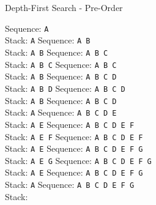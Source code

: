 \begin{frame}{Depth-First Search - Pre-Order}
{\bigskip
\begin{overprint}
Sequence: \alert{\texttt{A}}\\
Stack: \alert{\texttt{A}}
Sequence: \alert{\texttt{A  B}}\\
Stack: \alert{\texttt{A  B}}
Sequence: \alert{\texttt{A  B  C}}\\
Stack: \alert{\texttt{A  B  C}}
Sequence: \alert{\texttt{A  B  C}}\\
Stack: \alert{\texttt{A  B}}
Sequence: \alert{\texttt{A  B  C  D}}\\
Stack: \alert{\texttt{A  B  D}}
Sequence: \alert{\texttt{A  B  C  D}}\\
Stack: \alert{\texttt{A  B}}
Sequence: \alert{\texttt{A  B  C  D}}\\
Stack: \alert{\texttt{A}}
Sequence: \alert{\texttt{A  B  C  D  E}}\\
Stack: \alert{\texttt{A  E}}
Sequence: \alert{\texttt{A  B  C  D  E  F}}\\
Stack: \alert{\texttt{A  E  F}}
Sequence: \alert{\texttt{A  B  C  D  E  F}}\\
Stack: \alert{\texttt{A  E}}
Sequence: \alert{\texttt{A  B  C  D  E  F  G}}\\
Stack: \alert{\texttt{A  E  G}}
Sequence: \alert{\texttt{A  B  C  D  E  F  G}}\\
Stack: \alert{\texttt{A  E}}
Sequence: \alert{\texttt{A  B  C  D  E  F  G}}\\
Stack: \alert{\texttt{A}}
Sequence: \alert{\texttt{A  B  C  D  E  F  G}}\\
Stack: 
\end{overprint}
}
\end{frame}


